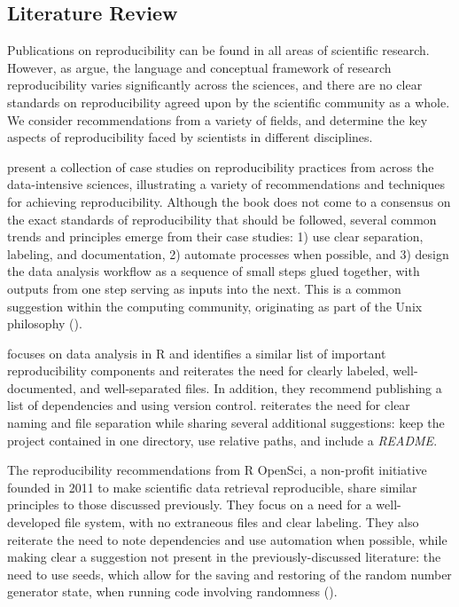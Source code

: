 \documentclass[APA,LATO1COL]{WileyNJD-v2}\usepackage[]{graphicx}\usepackage[]{color}
\newcommand{\R}{\textsf{R}\xspace}
\newcommand{\cmd}[1]{\textit{#1}}
\begin{document}
\subsection{Literature Review}\label{sec:papers}

Publications on reproducibility can be found in all areas of scientific research. However, as \cite{Goodman341ps12} argue, the language and conceptual framework of research reproducibility varies significantly across the sciences, and there are no clear standards on reproducibility agreed upon by the scientific community as a whole. We consider recommendations from a variety of fields, and determine the key aspects of reproducibility faced by scientists in different disciplines. 

\cite{kitzes2017practice} present a collection of case studies on reproducibility practices from across the data-intensive sciences, illustrating a variety of recommendations and techniques for achieving reproducibility. Although the book does not come to a consensus on the exact standards of reproducibility that should be followed, several common trends and principles emerge from their case studies: 1) use clear separation, labeling, and documentation, 2) automate processes when possible, and 3) design the data analysis workflow as a sequence of small steps glued together, with outputs from one step serving as inputs into the next. This is a common suggestion within the computing community, originating as part of the Unix philosophy (\cite{unix}).

\cite{cooper2017guide} focuses on data analysis in \R and identifies a similar list of important reproducibility components and reiterates the need for clearly labeled, well-documented, and well-separated files. In addition, they recommend publishing a list of dependencies and using version control. 
\cite{broman} reiterates the need for clear naming and file separation while sharing several additional suggestions: keep the project contained in one directory, use relative paths, and include a \cmd{README}.

The reproducibility recommendations from R OpenSci, a non-profit initiative founded in 2011 to make scientific data retrieval reproducible, share similar principles to those discussed previously. They focus on a need for a well-developed file system, with no extraneous files and clear labeling. They also reiterate the need to note dependencies and use automation when possible, while making clear a suggestion not present in the previously-discussed literature: the need to use seeds, which allow for the saving and restoring of the random number generator state, when running code involving randomness (\cite{r-opensci}).
\end{document}
